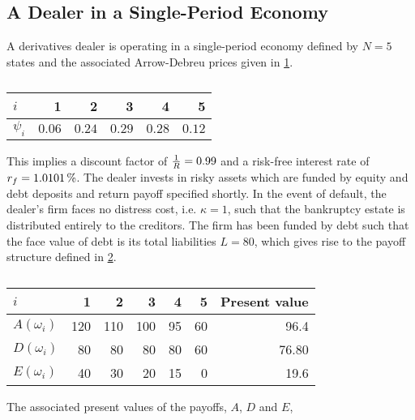 \documentclass[main.tex]{subfiles}
\begin{document}
    \subsection{A Dealer in a Single-Period Economy}

    A derivatives dealer is operating in a single-period economy
    defined by $N=5$ states and the associated Arrow-Debreu prices given in \cref{tbl:example-firm-structure}.
        \begin{table}[H]
            \centering
            \begin{tabular}{l|rrrrr}
                $i$ & 1 & 2 & 3 & 4 & 5 \\
                \hline
                $\psi_{i}$ & $\num{0.06}$ & $\num{0.24}$ & $\num{0.29}$ & $\num{0.28}$ & $\num{0.12}$ \\
            \end{tabular}
            \caption{}
            \label{tbl:example-firm-structure}
        \end{table}
    This implies a discount factor of $\frac{1}{R} = \num{0.99}$ and a risk-free interest rate of $\rfrate = \pct{0.010101}$.
    The dealer invests in risky assets 
    which are funded by equity and debt deposits and return payoff specified shortly.
    In the event of default, the dealer's firm faces no distress cost, i.e. $\kappa = 1$, 
    such that the bankruptcy estate is distributed entirely to the creditors.
    The firm has been funded by debt such that the face value of debt is its total liabilities $L=\num{80}$, 
    which gives rise to the payoff structure defined in \cref{tbl:example-pre-project-capital-structure}.
    \begin{table}[H]
        \centering
        \begin{tabular}{l|rrrrr||r}
            $i$ & 1 & 2 & 3 & 4 & 5 & Present value \\
            \hline
            \rule{0pt}{1.1em}
            $A(\omega_{i})$ & \num{120} & \num{110} & \num{100} & \num{95} & \num{60} & \num{96.4} \\
            $D(\omega_{i})$ & \num{80} & \num{80} & \num{80} & \num{80} & \num{60} & \num{76.80}\\
            $E(\omega_{i})$ & \num{40} & \num{30} & \num{20} & \num{15} & \num{0} & \num{19.6}
        \end{tabular}
        \caption{}
        \label{tbl:example-pre-project-capital-structure}
    \end{table}
    The associated present values of the payoffs, $A$, $D$ and $E$, 
\end{document}
